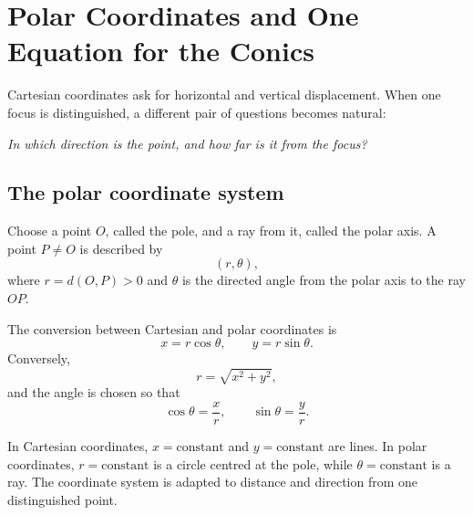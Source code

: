 \section{Polar Coordinates and One Equation for the Conics}

Cartesian coordinates ask for horizontal and vertical displacement. When one
focus is distinguished, a different pair of questions becomes natural:

\begin{center}
\emph{In which direction is the point, and how far is it from the focus?}
\end{center}

\subsection{The polar coordinate system}

Choose a point $O$, called the pole, and a ray from it, called the polar axis. A
point $P\neq O$ is described by
\[
\boxed{(r,\theta)},
\]
where $r=d(O,P)>0$ and $\theta$ is the directed angle from the polar axis to the
ray $OP$.

\begin{center}
\end{center}

The conversion between Cartesian and polar coordinates is
\[
\boxed{x=r\cos\theta,\qquad y=r\sin\theta}.
\]
Conversely,
\[
\boxed{r=\sqrt{x^2+y^2}},
\]
and the angle is chosen so that
\[
\cos\theta=\frac xr,
\qquad
\sin\theta=\frac yr.
\]

\begin{interpretationbox}
In Cartesian coordinates, $x=\text{constant}$ and $y=\text{constant}$ are lines.
In polar coordinates, $r=\text{constant}$ is a circle centred at the pole, while
$\theta=\text{constant}$ is a ray. The coordinate system is adapted to distance
and direction from one distinguished point.
\end{interpretationbox}

